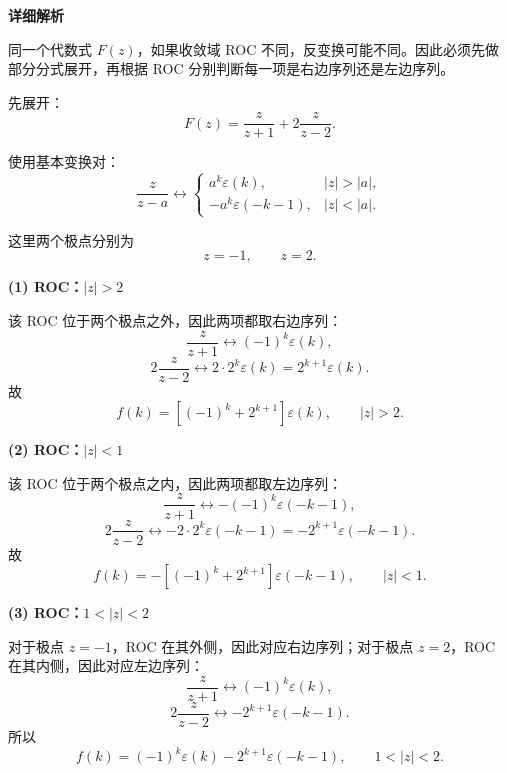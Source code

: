 \documentclass[12pt,a4paper]{ctexart}
\newcommand{\eps}{\varepsilon}
\begin{document}
\textbf{详细解析}

同一个代数式 $F(z)$，如果收敛域 ROC 不同，反变换可能不同。因此必须先做部分分式展开，再根据 ROC 分别判断每一项是右边序列还是左边序列。

先展开：
\[
F(z)=\frac{z}{z+1}+2\frac{z}{z-2}.
\]

使用基本变换对：
\[
\frac{z}{z-a}
\longleftrightarrow
\begin{cases}
a^k\eps(k),&|z|>|a|,\\[0.45em]
-a^k\eps(-k-1),&|z|<|a|.
\end{cases}
\]

这里两个极点分别为
\[
z=-1,\qquad z=2.
\]

\textbf{(1) ROC：$|z|>2$}

该 ROC 位于两个极点之外，因此两项都取右边序列：
\[
\frac{z}{z+1}
\longleftrightarrow
(-1)^k\eps(k),
\]
\[
2\frac{z}{z-2}
\longleftrightarrow
2\cdot2^k\eps(k)=2^{k+1}\eps(k).
\]
故
\[
\boxed{
f(k)=\left[(-1)^k+2^{k+1}\right]\eps(k),
\qquad |z|>2.}
\]

\textbf{(2) ROC：$|z|<1$}

该 ROC 位于两个极点之内，因此两项都取左边序列：
\[
\frac{z}{z+1}
\longleftrightarrow
-(-1)^k\eps(-k-1),
\]
\[
2\frac{z}{z-2}
\longleftrightarrow
-2\cdot2^k\eps(-k-1)=-2^{k+1}\eps(-k-1).
\]
故
\[
\boxed{
f(k)=-\left[(-1)^k+2^{k+1}\right]\eps(-k-1),
\qquad |z|<1.}
\]

\textbf{(3) ROC：$1<|z|<2$}

对于极点 $z=-1$，ROC 在其外侧，因此对应右边序列；对于极点 $z=2$，ROC 在其内侧，因此对应左边序列：
\[
\frac{z}{z+1}
\longleftrightarrow
(-1)^k\eps(k),
\]
\[
2\frac{z}{z-2}
\longleftrightarrow
-2^{k+1}\eps(-k-1).
\]
所以
\[
\boxed{
f(k)=(-1)^k\eps(k)-2^{k+1}\eps(-k-1),
\qquad 1<|z|<2.}
\]
\end{document}
